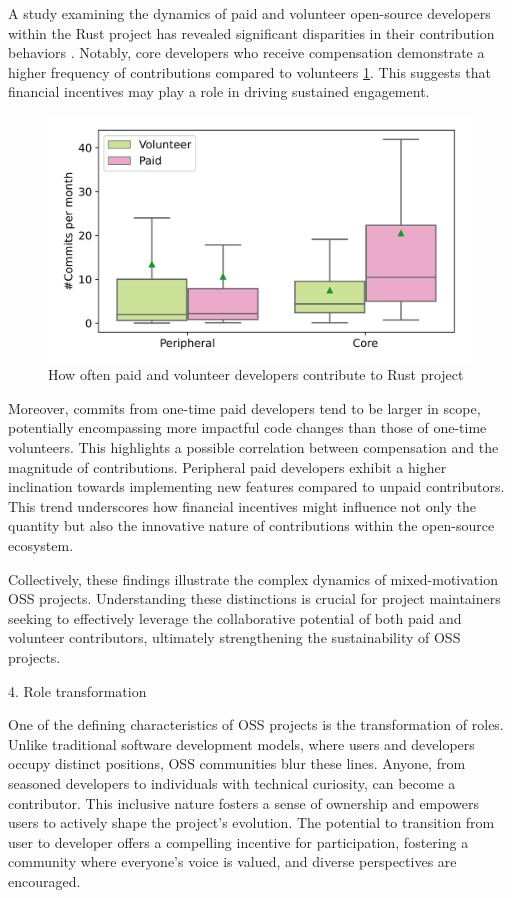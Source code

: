 A study examining the dynamics of paid and volunteer open-source developers within the Rust project has revealed significant disparities in their contribution behaviors \cite{08zhang2024paid}. Notably, core developers who receive compensation demonstrate a higher frequency of contributions compared to volunteers \ref{fig:contribution_frequency}. This suggests that financial incentives may play a role in driving sustained engagement.

\begin{figure}[ht]
    \centering
    \includegraphics[width=0.65\linewidth]{figs/Contribution_frequency.png}
    \caption{How often paid and volunteer developers contribute to Rust project \cite{08zhang2024paid}}
    \label{fig:contribution_frequency}
\end{figure}


Moreover, commits from one-time paid developers tend to be larger in scope, potentially encompassing more impactful code changes than those of one-time volunteers. This highlights a possible correlation between compensation and the magnitude of contributions. Peripheral paid developers exhibit a higher inclination towards implementing new features compared to unpaid contributors. This trend underscores how financial incentives might influence not only the quantity but also the innovative nature of contributions within the open-source ecosystem.

Collectively, these findings illustrate the complex dynamics of mixed-motivation OSS projects. Understanding these distinctions is crucial for project maintainers seeking to effectively leverage the collaborative potential of both paid and volunteer contributors, ultimately strengthening the sustainability of OSS projects.

4. Role transformation

One of the defining characteristics of OSS projects is the transformation of roles.  Unlike traditional software development models, where users and developers occupy distinct positions, OSS communities blur these lines.  Anyone, from seasoned developers to individuals with technical curiosity, can become a contributor.  This inclusive nature fosters a sense of ownership and empowers users to actively shape the project's evolution.  The potential to transition from user to developer offers a compelling incentive for participation, fostering a community where everyone's voice is valued, and diverse perspectives are encouraged.

